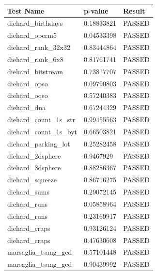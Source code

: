 \documentclass[conference]{IEEEtran}
\begin{document}
\begin{center}
\begin{table}
\renewcommand{\arraystretch}{1.2}
\centering
\begin{tabular}{|l|l|l|}
\hline
Test Name                              & p-value    & Result \\ \hline
diehard\_birthdays                     & 0.18833821 & PASSED \\ \hline
diehard\_operm5                        & 0.04533398 & PASSED \\ \hline
diehard\_rank\_32x32                   & 0.83444864 & PASSED \\ \hline
diehard\_rank\_6x8                     & 0.81761741 & PASSED \\ \hline
diehard\_bitstream                     & 0.73817707 & PASSED \\ \hline
diehard\_opso                          & 0.09790803 & PASSED \\ \hline
diehard\_oqso                          & 0.57240383 & PASSED \\ \hline
diehard\_dna                           & 0.67244329 & PASSED \\ \hline
diehard\_count\_1s\_str                & 0.99455563 & PASSED \\ \hline
diehard\_count\_1s\_byt                & 0.66503821 & PASSED \\ \hline
diehard\_parking\_lot                  & 0.25282458 & PASSED \\ \hline
diehard\_2dsphere                      & 0.9467929  & PASSED \\ \hline
diehard\_3dsphere                      & 0.88286367 & PASSED \\ \hline
diehard\_squeeze                       & 0.86716275 & PASSED \\ \hline
diehard\_sums                          & 0.29072145 & PASSED \\ \hline
diehard\_runs                          & 0.05858964 & PASSED \\ \hline
diehard\_runs                          & 0.23169917 & PASSED \\ \hline
diehard\_craps                         & 0.93126124 & PASSED \\ \hline
diehard\_craps                         & 0.47630608 & PASSED \\ \hline
marsaglia\_tsang\_gcd                  & 0.57101448 & PASSED \\ \hline
marsaglia\_tsang\_gcd                  & 0.90439992 & PASSED \\ \hline

\end{tabular}
\end{table}
\end{center}
\end{document}

